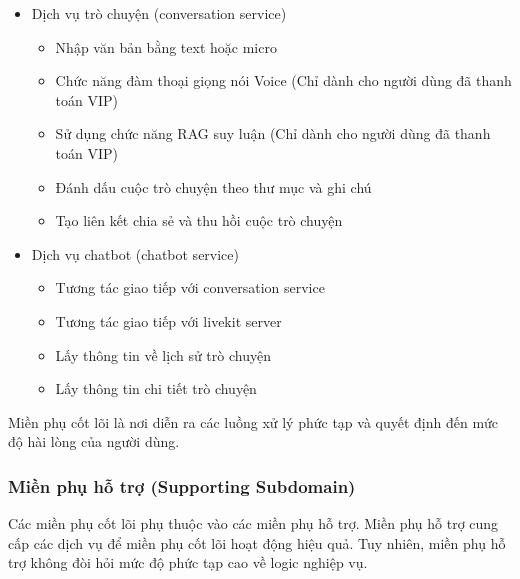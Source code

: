 \begin{itemize}


\item Dịch vụ trò chuyện (conversation service)


\begin{itemize}


\item Nhập văn bản bằng text hoặc micro
\item Chức năng đàm thoại giọng nói Voice (Chỉ dành cho người dùng đã thanh toán VIP)
\item Sử dụng chức năng RAG suy luận (Chỉ dành cho người dùng đã thanh toán VIP)
\item Đánh dấu cuộc trò chuyện theo thư mục và ghi chú
\item Tạo liên kết chia sẻ và thu hồi cuộc trò chuyện

\end{itemize}


\item Dịch vụ chatbot (chatbot service)


\begin{itemize}


\item Tương tác giao tiếp với conversation service
\item Tương tác giao tiếp với livekit server
\item Lấy thông tin về lịch sử trò chuyện
\item Lấy thông tin chi tiết trò chuyện
\end{itemize}

\end{itemize}


Miền phụ cốt lõi
là nơi diễn ra các luồng xử lý phức tạp
và quyết định đến mức độ hài lòng của người dùng.


\subsubsection{Miền phụ hỗ trợ (Supporting Subdomain)}

Các miền phụ cốt lõi phụ thuộc
vào các miền phụ hỗ trợ.
Miền phụ hỗ trợ cung cấp các dịch vụ
để miền phụ cốt lõi hoạt động hiệu quả.
Tuy nhiên, miền phụ hỗ trợ không đòi hỏi mức độ phức tạp cao về logic nghiệp vụ.


